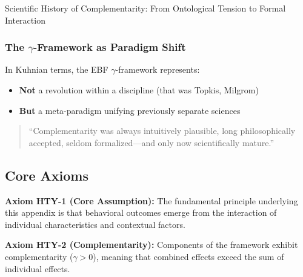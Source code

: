\begin{chapter}{Scientific History of Complementarity: From Ontological Tension to Formal Interaction}
\subsubsection{The $\gamma$-Framework as Paradigm Shift}

In Kuhnian terms, the EBF $\gamma$-framework represents:

\begin{itemize}
    \item \textbf{Not} a revolution within a discipline (that was Topkis, Milgrom)
    \item \textbf{But} a meta-paradigm unifying previously separate sciences
\end{itemize}

\begin{quote}
``Complementarity was always intuitively plausible, long philosophically accepted, seldom formalized---and only now scientifically mature.''
\end{quote}



\subsection{Core Axioms}
\label{sec:hty-axioms}

\begin{tcolorbox}[colback=yellow!5!white,colframe=yellow!75!black,title=Axiom HTY-1: Fundamental Principle]
\textbf{Axiom HTY-1 (Core Assumption):}
The fundamental principle underlying this appendix is that behavioral outcomes
emerge from the interaction of individual characteristics and contextual factors.
\end{tcolorbox}

\begin{tcolorbox}[colback=yellow!5!white,colframe=yellow!75!black,title=Axiom HTY-2: Complementarity]
\textbf{Axiom HTY-2 (Complementarity):}
Components of the framework exhibit complementarity ($\gamma > 0$), meaning
that combined effects exceed the sum of individual effects.
\end{tcolorbox}



\end{chapter}
